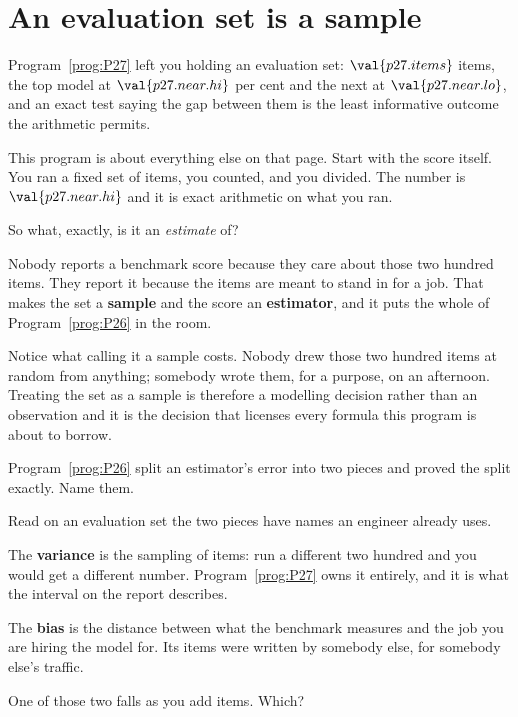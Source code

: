 \section{An evaluation set is a sample}
\label{sec:P34-a-sample}

\begin{fr}
Program~\ref{prog:P27} left you holding an evaluation set:
$\val{p27.items}$ items, the top model at $\val{p27.near.hi}$ per cent and
the next at $\val{p27.near.lo}$, and an exact test saying the gap between
them is the least informative outcome the arithmetic permits.

This program is about everything else on that page. Start with the score
itself. You ran a fixed set of items, you counted, and you divided. The
number is $\val{p27.near.hi}$ and it is exact arithmetic on what you ran.

So what, exactly, is it an \emph{estimate} of?
\dotline
\nextframe
\end{fr}

\begin{fr}

Nobody reports a benchmark score because they care about those two hundred
items. They report it because the items are meant to stand in for a job.
That makes the set a \textbf{sample} and the score an \textbf{estimator},
and it puts the whole of Program~\ref{prog:P26} in the room.

Notice what calling it a sample costs. Nobody drew those two hundred items at
random from anything; somebody wrote them, for a purpose, on an afternoon.
Treating the set as a sample is therefore a modelling decision rather than an
observation \dash{} and it is the decision that licenses every formula this
program is about to borrow.

Program~\ref{prog:P26} split an estimator's error into two pieces and proved
the split exactly. Name them.
\dotline
\nextframe
\end{fr}

\begin{fr}

Read on an evaluation set the two pieces have names an engineer already uses.

The \textbf{variance} is the sampling of items: run a different two hundred
and you would get a different number. Program~\ref{prog:P27} owns it
entirely, and it is what the interval on the report describes.

The \textbf{bias} is the distance between what the benchmark measures and
the job you are hiring the model for. Its items were written by somebody
else, for somebody else's traffic.

One of those two falls as you add items. Which?
\dotline
\nextframe
\end{fr}

